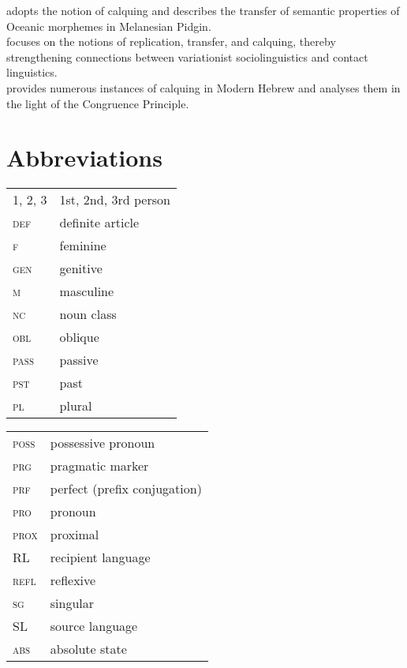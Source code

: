 \documentclass[output=paper]{langsci/langscibook}
\begin{document}
\citet{Keesing1988} adopts the notion of calquing and describes the transfer of semantic properties of Oceanic morphemes in Melanesian Pidgin.\\
\citet{Meyerhoff2009} focuses on the notions of replication, transfer, and calquing, thereby strengthening connections between variationist sociolinguistics and contact linguistics.\\
\citet{Zuckermann2009} provides numerous instances of calquing in Modern Hebrew and analyses them in the light of the Congruence Principle.

\section*{Abbreviations}

\begin{tabularx}{.5\textwidth}{@{}lQ@{}}
\textsc{1, 2, 3} & 1st, 2nd, 3rd person \\
\textsc{def} & definite article \\
\textsc{f} & feminine \\
\textsc{gen} & genitive \\
\textsc{m} & masculine \\
\textsc{nc} & noun class  \\
\textsc{obl} & oblique \\
\textsc{pass} & passive \\
\textsc{pst} & past \\
\textsc{pl} & plural \\
\end{tabularx}%
\begin{tabularx}{.5\textwidth}{@{}lQ@{}}
\textsc{poss} & possessive pronoun \\
\textsc{prg} & pragmatic marker \\
\textsc{prf} & perfect (prefix conjugation) \\
\textsc{pro} & pronoun \\
\textsc{prox} & proximal \\
RL & recipient language \\
\textsc{refl} & reflexive \\
\textsc{sg} & singular \\
SL & source language \\
\textsc{abs} & absolute state \\
\end{tabularx}%






\sloppy
\printbibliography[heading=subbibliography,notkeyword=this]
\end{document}
